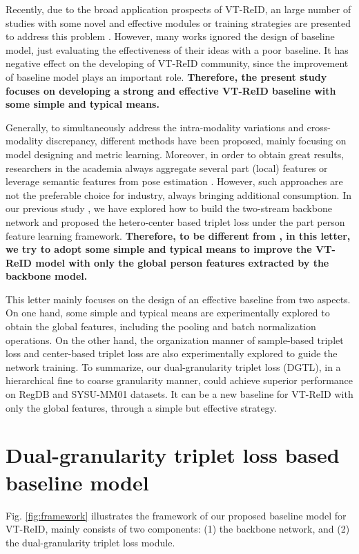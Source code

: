 \documentclass[journal]{IEEEtran}
\begin{document}
Recently, due to the broad application prospects of VT-ReID, an large number of studies with some novel and effective modules or training strategies are presented to address this problem \cite{liu2020enhancing,ye2020dynamic}. However, many works ignored the design of baseline model, just evaluating the effectiveness of their ideas with a poor baseline. It has negative effect on the developing of VT-ReID community, since the improvement of baseline model plays an important role. \textbf{Therefore, the present study focuses on developing a strong and effective VT-ReID baseline with some simple and typical means.}

Generally, to simultaneously address the intra-modality variations and cross-modality discrepancy, different methods have been proposed, mainly focusing on model designing and metric learning.
Moreover, in order to obtain great results, researchers in the academia always aggregate several part (local) features \cite{Wang2020MPMN} or leverage semantic features from pose estimation \cite{su2017pose}. However, such approaches are not the preferable choice for industry, always bringing additional consumption.
In our previous study \cite{Liu2020ParametersSE}, we have explored how to build the two-stream backbone network and proposed the hetero-center based triplet loss under the part person feature learning framework.
\textbf{Therefore, to be different from \cite{Liu2020ParametersSE}, in this letter, we try to adopt some simple and typical means to improve the VT-ReID model with only the global person features extracted by the backbone model.}

This letter mainly focuses on the design of an effective baseline from two aspects.
On one hand, some simple and typical means are experimentally explored to obtain the global features, including the pooling and batch normalization operations. On the other hand, the organization manner of sample-based triplet loss and center-based triplet loss are also experimentally explored to guide the network training. To summarize, our dual-granularity triplet loss (DGTL), in a hierarchical fine to coarse granularity manner, could achieve superior performance on RegDB \cite{nguyen2017person} and SYSU-MM01 \cite{wu2017rgb} datasets. It can be a new baseline for VT-ReID with only the global features, through a simple but effective strategy.

\section{Dual-granularity triplet loss based baseline model}
Fig. \ref{fig:framework} illustrates the framework of our proposed baseline model for VT-ReID, mainly consists of two components: (1) the backbone network, and (2) the dual-granularity triplet loss module.
\end{document}
